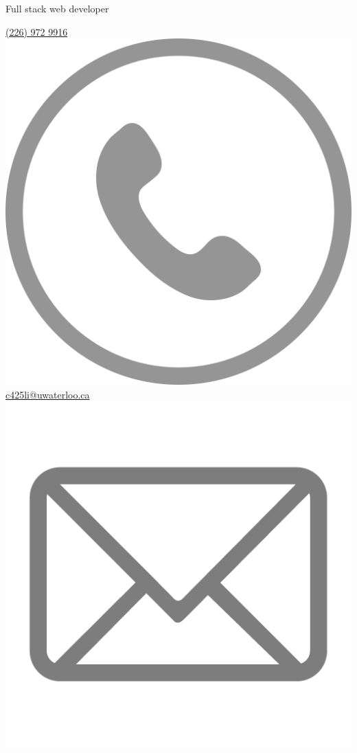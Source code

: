 \documentclass[]{friggeri-cv}
\begin{document}
       {Full stack web developer}


\begin{aside}
  \href{tel:12269729916}{(226) 972 9916 \includegraphics[scale=0.02]{phone-512.png}}
  \href{mailto:c425li@edu.uwaterloo.ca}{c425li@uwaterloo.ca\includegraphics[scale=0.04]{email-icon.png}}

\end{aside}
\end{document}
